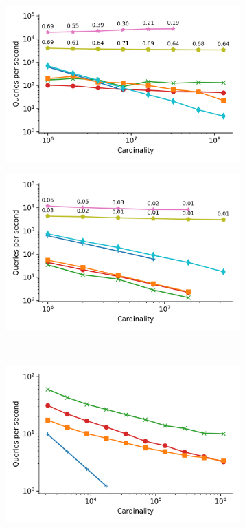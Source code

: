 \begin{figure}
\begin{subfigure}[b]{0.5\textwidth}
        \includegraphics[width=0.99\textwidth]{plots/sift_PermutedBall_10_throughput.png}
        \label{fig:results:sift-scaling}
    \end{subfigure}%
    \begin{subfigure}[b]{0.5\textwidth}
        \includegraphics[width=0.99\textwidth]{plots/random_PermutedBall_10_throughput.png}
        \label{fig:results:random-scaling}
    \end{subfigure}%
    \\
    \begin{subfigure}[b]{0.5\textwidth}
        \includegraphics[width=0.99\textwidth]{plots/silva-SSU-Ref_PermutedBall_10_throughput.png}

\end{subfigure}
\end{figure}

